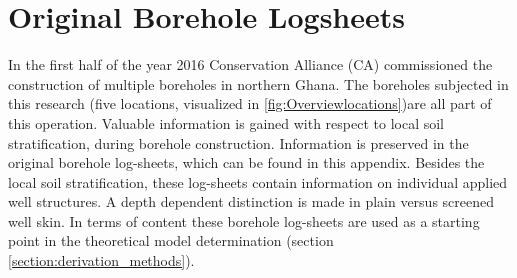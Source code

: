 \chapter{Original Borehole Logsheets}
\label{chapter:Borehole_logsheets}

In the first half of the year 2016 Conservation Alliance (CA) commissioned the construction of multiple boreholes in northern Ghana.  The boreholes subjected in this research (five locations, visualized in \ref{fig:Overviewlocations})are all part of this operation. Valuable information is gained with respect to local soil stratification, during borehole construction. Information is preserved in the original borehole log-sheets, which can be found in this appendix. Besides the local soil stratification, these log-sheets contain information on individual applied well structures. A depth dependent distinction is made in plain versus screened well skin. In terms of content these borehole log-sheets are used as a starting point in the theoretical model determination (section \ref{section:derivation_methods}). 





